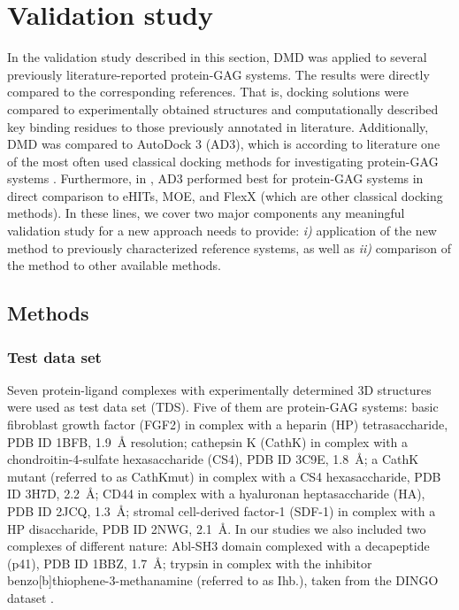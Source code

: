 \section{Validation study}

In the validation study described in this section, DMD was applied to several
previously literature-reported protein-GAG systems. The results were directly
compared to the corresponding references. That is, docking solutions were
compared to experimentally obtained structures and computationally described key
binding residues to those previously annotated in literature. Additionally, DMD
was compared to AutoDock 3 (AD3), which is according to literature one of the
most often used classical docking methods for investigating protein-GAG systems
\cite{japan_docking_ad3_clustering,pichert_characterization_2012,%
imberty_perez_protgag_comp_book_2006,franz_cathepsin_2013}. Furthermore, in
\cite{samsonov_docking_2011}, AD3 performed best for protein-GAG systems in
direct comparison to eHITs, MOE, and FlexX (which are other classical docking
methods). In these lines, we cover two major components any meaningful
validation study for a new approach needs to provide: \textit{i)} application of
the new method to previously characterized reference systems, as well as
\textit{ii)} comparison of the method to other available methods.

\subsection{Methods}
\subsubsection{Test data set}

Seven protein-ligand complexes with experimentally determined 3D structures were
used as test data set (TDS). Five of them are protein-GAG systems: basic
fibroblast growth factor (FGF2) in complex with a heparin (HP) tetrasaccharide,
PDB ID 1BFB, \SI{1.9}{\angstrom} resolution; cathepsin K (CathK) in complex with
a chondroitin-4-sulfate hexasaccharide (CS4), PDB ID 3C9E, \SI{1.8}{\angstrom};
a CathK mutant (referred to as CathKmut) in complex with a CS4 hexasaccharide,
PDB ID 3H7D, \SI{2.2}{\angstrom}; CD44 in complex with a hyaluronan
heptasaccharide (HA), PDB ID 2JCQ, \SI{1.3}{\angstrom}; stromal cell-derived
factor-1 (SDF-1) in complex with a HP disaccharide, PDB ID 2NWG,
\SI{2.1}{\angstrom}. In our studies we also included two complexes of different
nature: Abl-SH3 domain complexed with a decapeptide (p41), PDB ID 1BBZ,
\SI{1.7}{\angstrom}; trypsin in complex with the inhibitor
benzo[b]thiophene-3-methanamine (referred to as Ihb.), taken from the DINGO
dataset \cite{newman_dingo_2012}.

